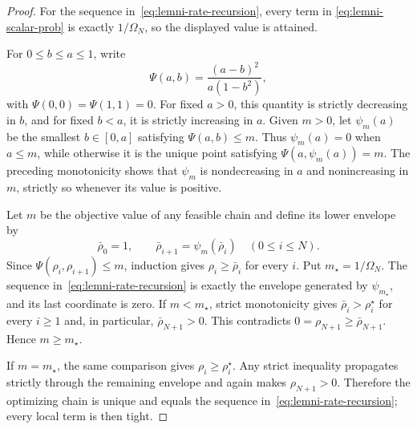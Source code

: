 \documentclass[11pt]{article}
\begin{document}
\begin{proof}
For the sequence in~\eqref{eq:lemni-rate-recursion}, every term in
\eqref{eq:lemni-scalar-prob} is exactly $1/\Omega_N$, so the displayed value is
attained.

For $0\leq b\leq a\leq1$, write
\[
    \Psi(a,b)=\frac{(a-b)^2}{a(1-b^2)},
\]
with $\Psi(0,0)=\Psi(1,1)=0$. For fixed $a>0$, this quantity is
strictly decreasing in $b$, and for fixed $b<a$, it is strictly increasing in
$a$. Given $m>0$, let $\psi_m(a)$ be the smallest $b\in[0,a]$ satisfying
$\Psi(a,b)\leq m$. Thus $\psi_m(a)=0$ when $a\leq m$, while otherwise it is
the unique point satisfying $\Psi(a,\psi_m(a))=m$. The preceding monotonicity
shows that $\psi_m$ is nondecreasing in $a$ and nonincreasing in $m$, strictly
so whenever its value is positive.

Let $m$ be the objective value of any feasible chain and define its lower
envelope by
\[
    \bar\rho_0=1,
    \qquad
    \bar\rho_{i+1}=\psi_m(\bar\rho_i)
    \quad(0\leq i\leq N).
\]
Since $\Psi(\rho_i,\rho_{i+1})\leq m$, induction gives
$\rho_i\geq\bar\rho_i$ for every $i$. Put $m_\star=1/\Omega_N$. The sequence
in~\eqref{eq:lemni-rate-recursion} is exactly the envelope generated by
$\psi_{m_\star}$, and its last coordinate is zero. If $m<m_\star$, strict
monotonicity gives $\bar\rho_i>\rho_i^\star$ for every $i\geq1$ and, in
particular, $\bar\rho_{N+1}>0$. This contradicts
$0=\rho_{N+1}\geq\bar\rho_{N+1}$. Hence $m\geq m_\star$.

If $m=m_\star$, the same comparison gives $\rho_i\geq\rho_i^\star$. Any strict
inequality propagates strictly through the remaining envelope and again makes
$\rho_{N+1}>0$. Therefore the optimizing chain is unique and equals the
sequence in~\eqref{eq:lemni-rate-recursion}; every local term is then tight.
\end{proof}
\end{document}
